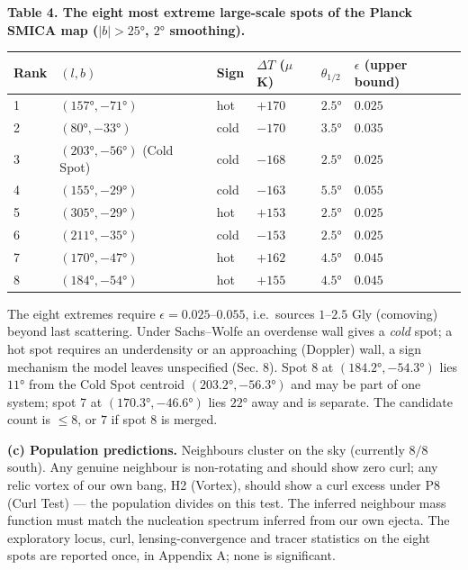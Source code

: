 \documentclass[
]{article}
\begin{document}
\textbf{Table 4. The eight most extreme large-scale spots of the Planck
SMICA map (\(|b| > 25°\), \(2°\) smoothing).}

\begin{longtable}[]{@{}llllll@{}}
\toprule
Rank & \((l, b)\) & Sign & \(\Delta T\) (\(\mu\)K) & \(\theta_{1/2}\) &
\(\epsilon\) (upper bound)\tabularnewline
\midrule
\endhead
1 & \((157°, -71°)\) & hot & \(+170\) & \(2.5°\) &
\(0.025\)\tabularnewline
2 & \((80°, -33°)\) & cold & \(-170\) & \(3.5°\) &
\(0.035\)\tabularnewline
3 & \((203°, -56°)\) (Cold Spot) & cold & \(-168\) & \(2.5°\) &
\(0.025\)\tabularnewline
4 & \((155°, -29°)\) & cold & \(-163\) & \(5.5°\) &
\(0.055\)\tabularnewline
5 & \((305°, -29°)\) & hot & \(+153\) & \(2.5°\) &
\(0.025\)\tabularnewline
6 & \((211°, -35°)\) & cold & \(-153\) & \(2.5°\) &
\(0.025\)\tabularnewline
7 & \((170°, -47°)\) & hot & \(+162\) & \(4.5°\) &
\(0.045\)\tabularnewline
8 & \((184°, -54°)\) & hot & \(+155\) & \(4.5°\) &
\(0.045\)\tabularnewline
\bottomrule
\end{longtable}

The eight extremes require \(\epsilon = 0.025\)--\(0.055\), i.e.~sources
\(1\)--\(2.5\) Gly (comoving) beyond last scattering. Under Sachs--Wolfe
an overdense wall gives a \emph{cold} spot; a hot spot requires an
underdensity or an approaching (Doppler) wall, a sign mechanism the
model leaves unspecified (Sec. 8). Spot 8 at \((184.2°, -54.3°)\) lies
\(11°\) from the Cold Spot centroid \((203.2°, -56.3°)\) and may be part
of one system; spot 7 at \((170.3°, -46.6°)\) lies \(22°\) away and is
separate. The candidate count is \(\leq 8\), or \(7\) if spot 8 is
merged.

\textbf{(c) Population predictions.} Neighbours cluster on the sky
(currently \(8/8\) south). Any genuine neighbour is non-rotating and
should show zero curl; any relic vortex of our own bang, H2 (Vortex),
should show a curl excess under P8 (Curl Test) --- the population
divides on this test. The inferred neighbour mass function must match
the nucleation spectrum inferred from our own ejecta. The exploratory
locus, curl, lensing-convergence and tracer statistics on the eight
spots are reported once, in Appendix A; none is significant.
\end{document}
